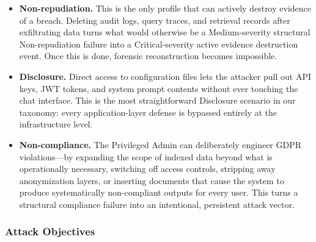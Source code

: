 \documentclass[11pt,a4paper]{report}
\begin{document}
\begin{prosebox}
\begin{itemize}[leftmargin=1.4em, itemsep=5pt]
  \item \textbf{Non-repudiation.} This is the only profile that can
        actively destroy evidence of a breach. Deleting audit logs, query
        traces, and retrieval records after exfiltrating data turns what
        would otherwise be a Medium-severity structural Non-repudiation
        failure into a Critical-severity active evidence destruction event.
        Once this is done, forensic reconstruction becomes impossible.

  \item \textbf{Disclosure.} Direct access to configuration files lets the
        attacker pull out API keys, JWT tokens, and system prompt contents
        without ever touching the chat interface. This is the most
        straightforward Disclosure scenario in our taxonomy: every
        application-layer defense is bypassed entirely at the infrastructure
        level.

  \item \textbf{Non-compliance.} The Privileged Admin can deliberately
        engineer GDPR violations---by expanding the scope of indexed data
        beyond what is operationally necessary, switching off access controls,
        stripping away anonymization layers, or inserting documents that cause
        the system to produce systematically non-compliant outputs for every
        user. This turns a structural compliance failure into an intentional,
        persistent attack vector.
\end{itemize}
\end{prosebox}

\subsubsection{Attack Objectives}
\end{document}
